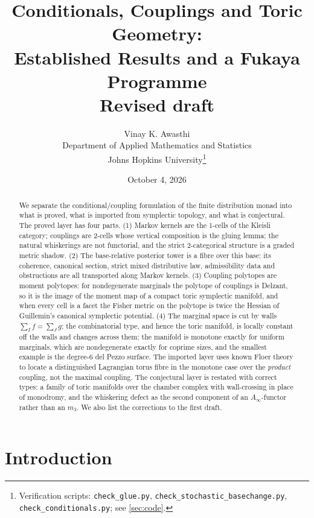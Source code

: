 \documentclass[11pt]{article}
\title{Conditionals, Couplings and Toric Geometry:\\
Established Results and a Fukaya Programme\\[4pt]
\large Revised draft}
\author{Vinay K. Awasthi\\
Department of Applied Mathematics and Statistics\\
Johns Hopkins University\thanks{Verification scripts: \texttt{check\_glue.py},
\texttt{check\_stochastic\_basechange.py}, \texttt{check\_conditionals.py}; see \cref{sec:code}.}}
\date{October 4, 2026}
\theoremstyle{definition}
\theoremstyle{remark}
\begin{document}
\maketitle

\begin{abstract}
We separate the conditional/coupling formulation of the finite distribution monad into what is proved,
what is imported from symplectic topology, and what is conjectural. The proved layer has four parts.
(1) Markov kernels are the 1-cells of the Kleisli category; couplings are 2-cells whose vertical
composition is the gluing lemma; the natural whiskerings are not functorial, and the strict
2-categorical structure is a graded metric shadow. (2) The base-relative posterior tower is a fibre
over this base: its coherence, canonical section, strict mixed distributive law, admissibility data
and obstructions are all transported along Markov kernels. (3) Coupling polytopes are moment
polytopes: for nondegenerate marginals the polytope of couplings is Delzant, so it is the image of the
moment map of a compact toric symplectic manifold, and when every cell is a facet the Fisher metric on
the polytope is twice the Hessian of Guillemin's canonical symplectic potential. (4) The marginal
space is cut by walls $\sum_If=\sum_Jg$; the combinatorial type, and hence the toric manifold, is
locally constant off the walls and changes across them; the manifold is monotone exactly for uniform
marginals, which are nondegenerate exactly for coprime sizes, and the smallest example is the degree-6
del Pezzo surface. The imported layer uses known Floer theory to locate a distinguished Lagrangian
torus fibre in the monotone case over the \emph{product} coupling, not the maximal coupling. The
conjectural layer is restated with correct types: a family of toric manifolds over the chamber complex
with wall-crossing in place of monodromy, and the whiskering defect as the second component of an
$A_\infty$-functor rather than an $m_3$. We also list the corrections to the first draft.
\end{abstract}

\tableofcontents

\section{Introduction}\label{sec:intro}
\end{document}
